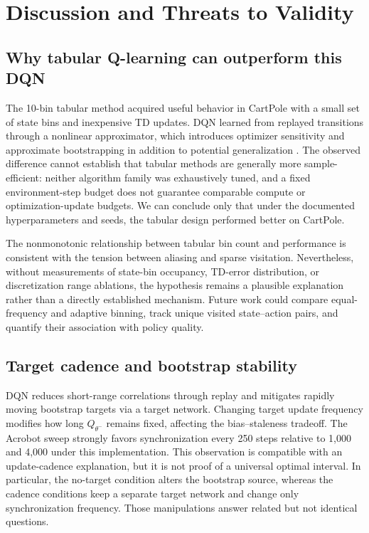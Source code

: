 \documentclass[conference,10pt]{IEEEtran}
\begin{document}
\section{Discussion and Threats to Validity}
\subsection{Why tabular Q-learning can outperform this DQN}
The 10-bin tabular method acquired useful behavior in CartPole with a small set of state bins and inexpensive TD updates. DQN learned from replayed transitions through a nonlinear approximator, which introduces optimizer sensitivity and approximate bootstrapping in addition to potential generalization \cite{vanHasselt2016}. The observed difference cannot establish that tabular methods are generally more sample-efficient: neither algorithm family was exhaustively tuned, and a fixed environment-step budget does not guarantee comparable compute or optimization-update budgets. We can conclude only that under the documented hyperparameters and seeds, the tabular design performed better on CartPole.

The nonmonotonic relationship between tabular bin count and performance is consistent with the tension between aliasing and sparse visitation. Nevertheless, without measurements of state-bin occupancy, TD-error distribution, or discretization range ablations, the hypothesis remains a plausible explanation rather than a directly established mechanism. Future work could compare equal-frequency and adaptive binning, track unique visited state--action pairs, and quantify their association with policy quality.

\subsection{Target cadence and bootstrap stability}
DQN reduces short-range correlations through replay and mitigates rapidly moving bootstrap targets via a target network. Changing target update frequency modifies how long $Q_{\theta^-}$ remains fixed, affecting the bias--staleness tradeoff. The Acrobot sweep strongly favors synchronization every 250 steps relative to 1,000 and 4,000 under this implementation. This observation is compatible with an update-cadence explanation, but it is not proof of a universal optimal interval. In particular, the no-target condition alters the bootstrap source, whereas the cadence conditions keep a separate target network and change only synchronization frequency. Those manipulations answer related but not identical questions.
\end{document}
